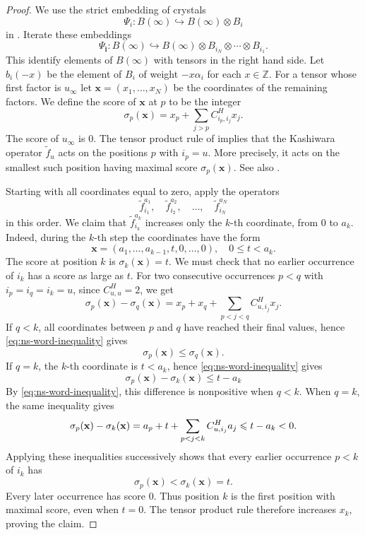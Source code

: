 \documentclass[11pt,reqno]{amsart}
\theoremstyle{definition}
\theoremstyle{remark}
\def\bbZ{\mathbb Z}
\begin{document}
\begin{proof}
We use the strict embedding of crystals
\[
\Psi_i:B(\infty)\hookrightarrow B(\infty)\otimes B_i
\]
in \cite[Thm.~3.2.2]{KS97}.
Iterate these embeddings
\[
\Psi_{\mathbf i}:B(\infty)\hookrightarrow
B(\infty)\otimes B_{i_N}\otimes\cdots\otimes B_{i_1}.
\]
This identify elements of $B(\infty)$ with tensors in the right hand side.
 Let $b_i(-x)$ be the element of $B_i$ of weight $-x\alpha_i$ for each $x\in\bbZ$.
For a tensor whose first factor is $u_\infty$ let
$\mathbf x=(x_1,\ldots,x_N)$ be the coordinates of the remaining factors. 
We define the score of $\mathbf x$ at $p$ to be the integer
\[
\sigma_p(\mathbf x)=x_p+\sum_{j>p}C_{i_p,i_j}^H x_j.
\]
The score of $u_\infty$ is $0$.
The tensor product rule of \cite[\S2.2]{NZ97} implies that the Kashiwara operator
$\widetilde f_u$ acts on the positions $p$ with $i_p=u$. More precisely, it acts on
the smallest such position having maximal score $\sigma_p(\mathbf x)$. 
See also \cite[(2.32)-(2.33)]{NZ97}.

Starting with all coordinates equal to zero, apply the operators
\[
\widetilde f_{i_1}^{a_1},\quad
\widetilde f_{i_2}^{a_2},\quad\ldots,\quad
\widetilde f_{i_N}^{a_N}
\]
in this order. We claim that $\widetilde f_{i_k}^{a_k}$ increases
only the $k$-th coordinate, from $0$ to $a_k$.
Indeed, during the $k$-th step the coordinates have the form
\[
\mathbf x=(a_1,\ldots,a_{k-1},t,0,\ldots,0),
\quad 0\leqslant t<a_k.
\]
The score at position $k$ is $\sigma_k(\mathbf x)=t$. We must
check that no earlier occurrence of $i_k$ has a score as large as $t$.
For two consecutive occurrences $p<q$ with $i_p=i_q=i_k=u$, since $C_{u,u}^H=2$, we get
\[
\sigma_p(\mathbf x)-\sigma_q(\mathbf x)
=x_p+x_q+\sum_{p<j<q}C_{u,i_j}^H x_j.
\]
If \(q<k\), all coordinates between \(p\) and \(q\) have reached their final values, hence \eqref{eq:ns-word-inequality} gives 
$$\sigma_p(\mathbf x)\leqslant\sigma_q(\mathbf x).$$ 
If \(q=k\), the \(k\)-th coordinate is \(t<a_k\), hence \eqref{eq:ns-word-inequality} gives
\[
\sigma_p(\mathbf x)-\sigma_k(\mathbf x)
\leqslant t-a_k \]
By \eqref{eq:ns-word-inequality}, this difference is nonpositive
when $q<k$. When $q=k$, the same inequality gives
\[
\sigma_p(\mathbf x)-\sigma_k(\mathbf x)=a_p+t+\sum_{p<j<k}C^H_{u,i_j}a_j\\
\leqslant t-a_k<0.
\]
Applying these inequalities successively shows that every earlier
occurrence $p<k$ of $i_k$ has
\[
\sigma_p(\mathbf x)<\sigma_k(\mathbf x)=t.
\]
Every later occurrence has score $0$. Thus position $k$ is the
first position with maximal score, even when $t=0$. The
tensor product rule therefore increases $x_k$, proving the claim.


\end{proof}
\end{document}
